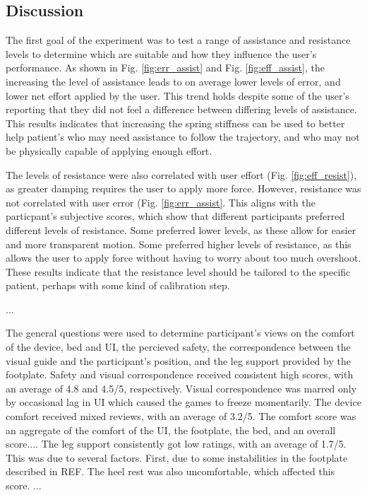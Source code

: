 \documentclass[12pt]{report}
\begin{document}
		
		\subsection{Discussion}
		
		The first goal of the experiment was to test a range of assistance and resistance levels to determine which are suitable and how they influence the user's performance. As shown in Fig. \ref{fig:err_assist} and Fig. \ref{fig:eff_assist}, the increasing the level of assistance leads to on average lower levels of error, and lower net effort applied by the user. This trend holds despite some of the user's reporting that they did not feel a difference between differing levels of assistance. This results indicates that increasing the spring stiffness can be used to better help patient's who may need assistance to follow the trajectory, and who may not be physically capable of applying enough effort. 
		
		The levels of resistance were also correlated with user effort (Fig. \ref{fig:eff_resist}), as greater damping requires the user to apply more force. However, resistance was not correlated with user error (Fig. \ref{fig:err_assist}. This aligns with the particpant's subjective scores, which show that different participants preferred different levels of resistance. Some preferred lower levels, as these allow for easier and more transparent motion. Some preferred higher levels of resistance, as this allows the user to apply force without having to worry about too much overshoot. These results indicate that the resistance level should be tailored to the specific patient, perhaps with some kind of calibration step.  
		
		...
		
		The general questions were used to determine participant's views on the comfort of the device, bed and UI, the percieved safety, the correspondence between the visual guide and the participant's position, and the leg support provided by the footplate. Safety and visual correspondence received  consistent high scores, with an average of 4.8 and 4.5/5, respectively. Visual correspondence was marred only by occasional lag in UI which caused the games to freeze momentarily. The device comfort received mixed reviews, with an average of 3.2/5. The comfort score was an aggregate of the comfort of the UI, the footplate, the bed, and an overall score.... The leg support consistently got low ratings, with an average of 1.7/5. This was due to several factors. First, due to some instabilities in the footplate described in REF. The heel rest was also uncomfortable, which affected this score. ...
		
\end{document}

